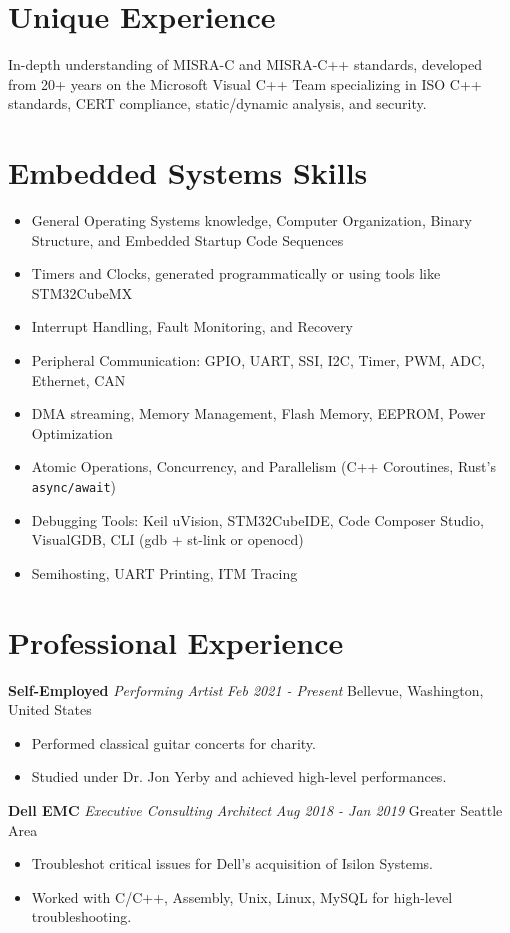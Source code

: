 \documentclass[a4paper,10pt]{article}
\begin{document}
\section*{Unique Experience}
In-depth understanding of MISRA-C and MISRA-C++ standards, developed from 20+ years on the Microsoft Visual C++ Team specializing in ISO C++ standards, CERT compliance, static/dynamic analysis, and security.

\section*{Embedded Systems Skills}
\begin{itemize}[leftmargin=1cm]
    \item General Operating Systems knowledge, Computer Organization, Binary Structure, and Embedded Startup Code Sequences
    \item Timers and Clocks, generated programmatically or using tools like STM32CubeMX
    \item Interrupt Handling, Fault Monitoring, and Recovery
    \item Peripheral Communication: GPIO, UART, SSI, I2C, Timer, PWM, ADC, Ethernet, CAN
    \item DMA streaming, Memory Management, Flash Memory, EEPROM, Power Optimization
    \item Atomic Operations, Concurrency, and Parallelism (C++ Coroutines, Rust’s \texttt{async/await})
    \item Debugging Tools: Keil uVision, STM32CubeIDE, Code Composer Studio, VisualGDB, CLI (gdb + st-link or openocd)
    \item Semihosting, UART Printing, ITM Tracing
\end{itemize}

\section*{Professional Experience}

\textbf{Self-Employed}  
\emph{Performing Artist}  
\textit{Feb 2021 - Present}  
Bellevue, Washington, United States
\begin{itemize}[leftmargin=1cm]
    \item Performed classical guitar concerts for charity.
    \item Studied under Dr. Jon Yerby and achieved high-level performances.
\end{itemize}

\textbf{Dell EMC}  
\emph{Executive Consulting Architect}  
\textit{Aug 2018 - Jan 2019}  
Greater Seattle Area
\begin{itemize}[leftmargin=1cm]
    \item Troubleshot critical issues for Dell's acquisition of Isilon Systems.
    \item Worked with C/C++, Assembly, Unix, Linux, MySQL for high-level troubleshooting.
\end{itemize}
\end{document}
